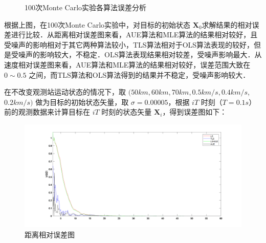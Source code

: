 \begin{figure}[htbp]
	\vspace{13pt}
	\centering

	\caption{100次Monte Carlo实验各算法误差分析}
\end{figure}

\newpage

根据上图，在100次Monte Carlo实验中，对目标的初始状态 $\bm{X}_0$求解结果的相对误差进行比较．从距离相对误差图来看，AUE算法和MLE算法的结果相对较好，且受噪声的影响相对于其它两种算法较小，TLS算法相对于OLS算法表现的较好，但是受噪声的影响较大，不稳定．OLS算法表现结果相对较差，受噪声影响最大．从速度相对误差图来看，AUE算法和MLE算法的结果相对较好，误差范围大致在 $0 \sim 0.5$ 之间，而TLS算法和OLS算法得到的结果并不稳定，受噪声影响较大．

在不改变观测站运动状态的情况下，取 $(50km,60km,70km,0.5km/s,0.4km/s$, $ 0.2km/s)$ 做为目标的初始状态矢量，取 $\sigma=0.00005$，根据 $iT$ 时刻（$T=0.1s$）前的观测数据来计算目标在 $iT$ 时刻的状态矢量 $\bm{X}_i$，得到误差图如下：
\begin{figure}[htbp]
	\centering
	\includegraphics[width=\linewidth]{images/singleline.png}
	\caption{距离相对误差图}
\end{figure}

